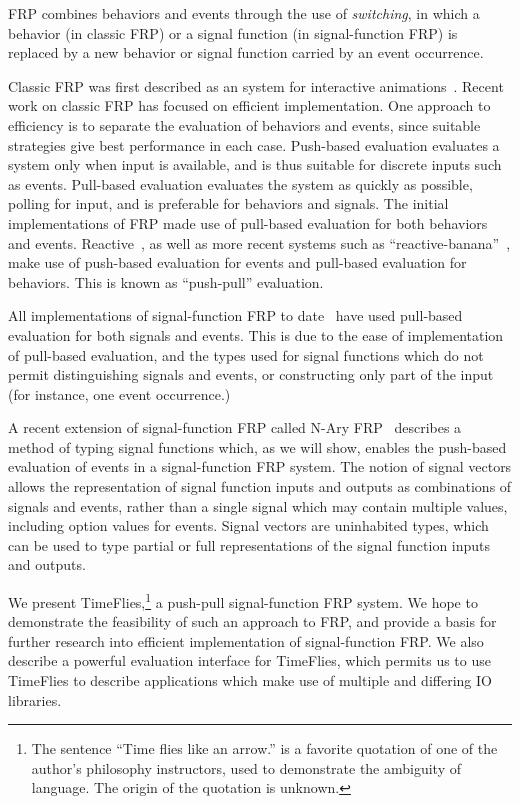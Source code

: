 \documentclass[draft]{llncs}
\begin{document}
FRP combines behaviors and events through the use of {\em switching}, in which
a behavior (in classic FRP) or a signal function (in signal-function FRP) is
replaced by a new behavior or signal function carried by an event occurrence.

Classic FRP was first described as an system for interactive animations~\cite{Elliott1997}.
Recent work on classic FRP has focused on efficient implementation. One approach to
efficiency is to separate the evaluation of behaviors and events, since suitable 
strategies give best performance in each case. Push-based evaluation evaluates a
system only when input is available, and is thus suitable for discrete inputs
such as events. Pull-based evaluation evaluates the system as quickly as
possible, polling for input, and is preferable for behaviors and signals.
The initial implementations of FRP made use of pull-based evaluation for both
behaviors and events. Reactive~\cite{Elliott2009}, as well as more recent systems such as
``reactive-banana''~\cite{Apfelmus}, make use of push-based evaluation for
events and pull-based evaluation for behaviors. This is known as ``push-pull''
evaluation.

All implementations of signal-function FRP to date~\cite{Courtney2001-1,Nilsson2002,Nilsson2005,Sculthorpe2011}
have used pull-based evaluation for both signals and events. This is due to
the ease of implementation of pull-based evaluation, and the types used for
signal functions which do not permit distinguishing signals and events, or
constructing only part of the input (for instance, one event occurrence.)

A recent extension of signal-function FRP called N-Ary FRP~\cite{Sculthorpe2011}
describes a method of typing signal functions which, as we will show, enables
the push-based evaluation of events in a signal-function FRP system. The notion
of signal vectors allows the representation of signal function inputs and
outputs as combinations of signals and events, rather than a single signal which
may contain multiple values, including option values for events. Signal vectors
are uninhabited types, which can be used to type partial or full representations
of the signal function inputs and outputs.

We present TimeFlies,\footnote{The sentence ``Time flies like an arrow.'' is a 
favorite quotation of one of the author's philosophy instructors, used to
demonstrate the ambiguity of language. The origin of the quotation is unknown.}
a push-pull signal-function FRP system. We hope to demonstrate the feasibility
of such an approach to FRP, and provide a basis for further research into
efficient implementation of signal-function FRP. We also describe a powerful
evaluation interface for TimeFlies, which permits us to use TimeFlies to
describe applications which make use of multiple and differing IO libraries.
\end{document}
